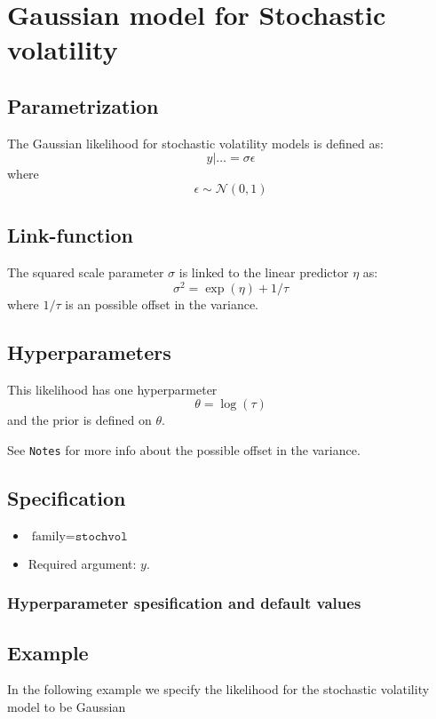 \documentclass[a4paper,11pt]{article}
\begin{document}
\section*{Gaussian model for Stochastic volatility}

\subsection*{Parametrization}

The Gaussian likelihood for stochastic volatility models is defined
as:
\[
y |\ldots =\sigma \epsilon
\]
where
\[
\epsilon \sim\mathcal{N}(0,1)
\]

\subsection*{Link-function}

The squared scale parameter $\sigma$ is linked to the linear predictor
$\eta$ as:
\[
\sigma^{2} =\exp(\eta) + 1/\tau
\]
where $1/\tau$ is an possible offset in the variance.

\subsection*{Hyperparameters}

This likelihood has one hyperparmeter
\begin{displaymath}
    \theta = \log(\tau)
\end{displaymath}
and the prior is defined on $\theta$.

See \texttt{Notes} for more info about the possible offset in the variance.

\subsection*{Specification}

\begin{itemize}
\item $\text{family}=\texttt{stochvol}$
\item Required argument: $y$.
\end{itemize}

\subsubsection*{Hyperparameter spesification and default values}


\subsection*{Example}
In the following example we specify the likelihood for the stochastic
volatility model to be Gaussian
 
\end{document}

